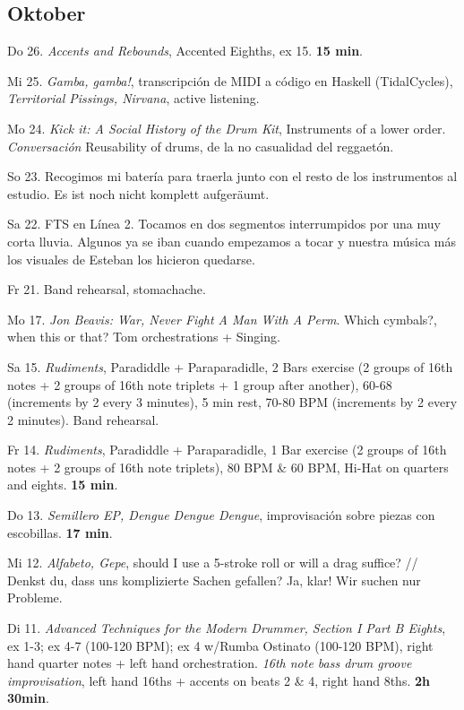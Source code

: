 \documentclass[
]{book}
\begin{document}
\hypertarget{oktober-2022}{%
\subsection*{Oktober}\label{oktober-2022}}

Do 26. \emph{Accents and Rebounds}, Accented Eighths, ex 15. \textbf{15 min}.

Mi 25. \emph{Gamba, gamba!}, transcripción de MIDI a código en Haskell (TidalCycles), \emph{Territorial Pissings, Nirvana}, active listening.

Mo 24. \emph{Kick it: A Social History of the Drum Kit}, Instruments of a lower order. \emph{Conversación} Reusability of drums, de la no casualidad del reggaetón.

So 23. Recogimos mi batería para traerla junto con el resto de los instrumentos al estudio. Es ist noch nicht komplett aufgeräumt.

Sa 22. FTS en Línea 2. Tocamos en dos segmentos interrumpidos por una muy corta lluvia. Algunos ya se iban cuando empezamos a tocar y nuestra música más los visuales de Esteban los hicieron quedarse.

Fr 21. Band rehearsal, stomachache.

Mo 17. \emph{Jon Beavis: War, Never Fight A Man With A Perm}. Which cymbals?, when this or that? Tom orchestrations + Singing.

Sa 15. \emph{Rudiments}, Paradiddle + Paraparadidle, 2 Bars exercise (2 groups of 16th notes + 2 groups of 16th note triplets + 1 group after another), 60-68 (increments by 2 every 3 minutes), 5 min rest, 70-80 BPM (increments by 2 every 2 minutes). Band rehearsal.

\hypertarget{okt152022}{}

Fr 14. \emph{Rudiments}, Paradiddle + Paraparadidle, 1 Bar exercise (2 groups of 16th notes + 2 groups of 16th note triplets), 80 BPM \& 60 BPM, Hi-Hat on quarters and eights. \textbf{15 min}.

Do 13. \emph{Semillero EP, Dengue Dengue Dengue}, improvisación sobre piezas con escobillas. \textbf{17 min}.

Mi 12. \emph{Alfabeto, Gepe}, should I use a 5-stroke roll or will a drag suffice? // Denkst du, dass uns komplizierte Sachen gefallen? Ja, klar! Wir suchen nur Probleme.

Di 11. \emph{Advanced Techniques for the Modern Drummer, Section I Part B Eights}, ex 1-3; ex 4-7 (100-120 BPM); ex 4 w/Rumba Ostinato (100-120 BPM), right hand quarter notes + left hand orchestration. \emph{16th note bass drum groove improvisation}, left hand 16ths + accents on beats 2 \& 4, right hand 8ths. \textbf{2h 30min}.
\end{document}
